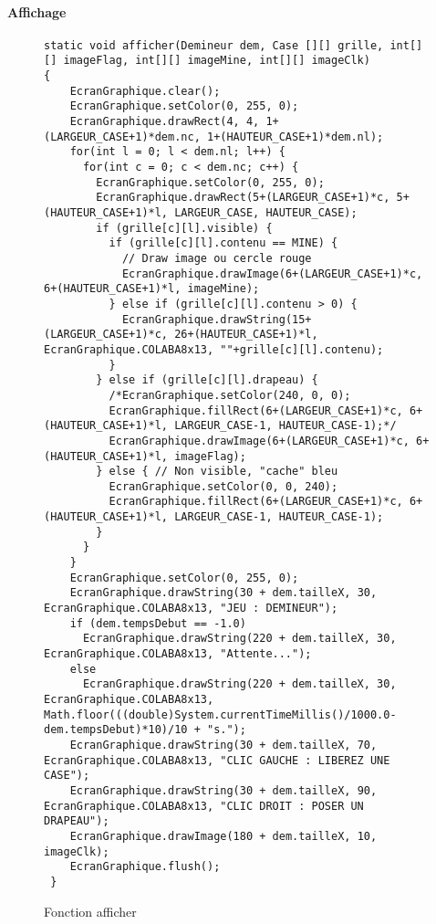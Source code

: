 \documentclass[a4paper, 12pt, oneside]{article}
\begin{document}
\paragraph{Affichage}
\begin{figure}[hpt]
	\center
	\caption{\label{Fonction afficher} Fonction afficher}
\begin{lstlisting}
static void afficher(Demineur dem, Case [][] grille, int[][] imageFlag, int[][] imageMine, int[][] imageClk) 
{
    EcranGraphique.clear();
    EcranGraphique.setColor(0, 255, 0);
    EcranGraphique.drawRect(4, 4, 1+(LARGEUR_CASE+1)*dem.nc, 1+(HAUTEUR_CASE+1)*dem.nl);
    for(int l = 0; l < dem.nl; l++) {
      for(int c = 0; c < dem.nc; c++) {
        EcranGraphique.setColor(0, 255, 0);
        EcranGraphique.drawRect(5+(LARGEUR_CASE+1)*c, 5+(HAUTEUR_CASE+1)*l, LARGEUR_CASE, HAUTEUR_CASE);
        if (grille[c][l].visible) {
          if (grille[c][l].contenu == MINE) {
            // Draw image ou cercle rouge
            EcranGraphique.drawImage(6+(LARGEUR_CASE+1)*c, 6+(HAUTEUR_CASE+1)*l, imageMine);
          } else if (grille[c][l].contenu > 0) {
            EcranGraphique.drawString(15+(LARGEUR_CASE+1)*c, 26+(HAUTEUR_CASE+1)*l, EcranGraphique.COLABA8x13, ""+grille[c][l].contenu);
          }
        } else if (grille[c][l].drapeau) {
          /*EcranGraphique.setColor(240, 0, 0);
          EcranGraphique.fillRect(6+(LARGEUR_CASE+1)*c, 6+(HAUTEUR_CASE+1)*l, LARGEUR_CASE-1, HAUTEUR_CASE-1);*/
          EcranGraphique.drawImage(6+(LARGEUR_CASE+1)*c, 6+(HAUTEUR_CASE+1)*l, imageFlag);
        } else { // Non visible, "cache" bleu
          EcranGraphique.setColor(0, 0, 240);
          EcranGraphique.fillRect(6+(LARGEUR_CASE+1)*c, 6+(HAUTEUR_CASE+1)*l, LARGEUR_CASE-1, HAUTEUR_CASE-1);
        }
      }
    }
    EcranGraphique.setColor(0, 255, 0);
    EcranGraphique.drawString(30 + dem.tailleX, 30, EcranGraphique.COLABA8x13, "JEU : DEMINEUR");
    if (dem.tempsDebut == -1.0)
      EcranGraphique.drawString(220 + dem.tailleX, 30, EcranGraphique.COLABA8x13, "Attente...");
    else
      EcranGraphique.drawString(220 + dem.tailleX, 30, EcranGraphique.COLABA8x13, Math.floor(((double)System.currentTimeMillis()/1000.0-dem.tempsDebut)*10)/10 + "s.");
    EcranGraphique.drawString(30 + dem.tailleX, 70, EcranGraphique.COLABA8x13, "CLIC GAUCHE : LIBEREZ UNE CASE");
    EcranGraphique.drawString(30 + dem.tailleX, 90, EcranGraphique.COLABA8x13, "CLIC DROIT : POSER UN DRAPEAU");
    EcranGraphique.drawImage(180 + dem.tailleX, 10, imageClk);
    EcranGraphique.flush();
 }
\end{lstlisting}
\end{figure}
\end{document}
